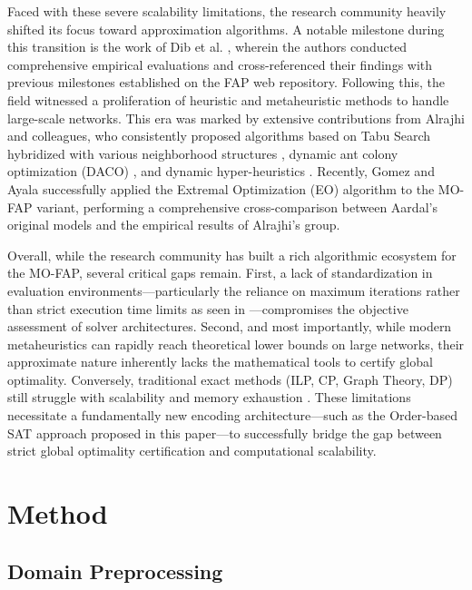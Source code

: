 \documentclass[letterpaper,journal]{IEEEtran}
\begin{document}
Faced with these severe scalability limitations, the research community heavily shifted its focus toward approximation algorithms. A notable milestone during this transition is the work of Dib et al. \cite{Dib2009}, wherein the authors conducted comprehensive empirical evaluations and cross-referenced their findings with previous milestones established on the FAP web repository. Following this, the field witnessed a proliferation of heuristic and metaheuristic methods to handle large-scale networks. This era was marked by extensive contributions from Alrajhi and colleagues, who consistently proposed algorithms based on Tabu Search hybridized with various neighborhood structures \cite{Alrajhi2016_Hybridized}, dynamic ant colony optimization (DACO) \cite{Alrajhi2023DynamicACO}, and dynamic hyper-heuristics \cite{Alrajhi2023DynamicHyper}. Recently, Gomez and Ayala \cite{Gomez2023MO} successfully applied the Extremal Optimization (EO) algorithm to the MO-FAP variant, performing a comprehensive cross-comparison between Aardal's original models \cite{Aardal2007} and the empirical results of Alrajhi's group.

Overall, while the research community has built a rich algorithmic ecosystem for the MO-FAP, several critical gaps remain. First, a lack of standardization in evaluation environments—particularly the reliance on maximum iterations rather than strict execution time limits as seen in \cite{Gomez2023MO}—compromises the objective assessment of solver architectures. Second, and most importantly, while modern metaheuristics can rapidly reach theoretical lower bounds on large networks, their approximate nature inherently lacks the mathematical tools to certify global optimality. Conversely, traditional exact methods (ILP, CP, Graph Theory, DP) still struggle with scalability and memory exhaustion \cite{Aardal2007,Mahmoudi2023}. These limitations necessitate a fundamentally new encoding architecture—such as the Order-based SAT approach proposed in this paper—to successfully bridge the gap between strict global optimality certification and computational scalability.

\section{Method}
\label{sec:method}

\subsection{Domain Preprocessing}
\label{subsec:preprocessing}
\end{document}
